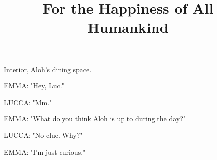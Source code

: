 \documentclass[11pt]{article}
\begin{document}
\ttfamily
\title{For the Happiness of All Humankind}
\maketitle

Interior, Aloh's dining space.

EMMA: "Hey, Luc."

LUCCA: "Mm."

EMMA: "What do you think Aloh is up to during the day?"

LUCCA: "No clue. Why?"

EMMA: "I'm just curious."
\end{document}
